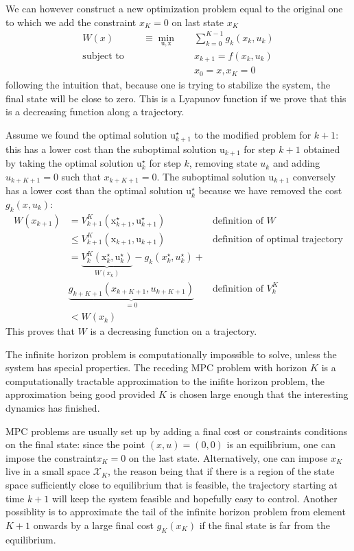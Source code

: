 \documentclass[11pt]{report}
\newcommand{\bs}[1]{\boldsymbol{#1}}
\newcommand{\bsu}{\bs{\mathrm{u}}}
\newcommand{\bsx}{\bs{\mathrm{x}}}
\begin{document}
We can however construct a new optimization problem equal to the original one to which we add the constraint $x_K=0$ on last state $x_K$
\begin{align*}
  W(x) \qquad\quad\equiv \min_{\bsu,\bsx} &\quad \sum_{k=0}^{K-1} g_k(x_k,u_k) \\
  \text{subject to } &\quad x_{k+1} = f(x_k,u_k) \\
  &\quad  x_0 = x, x_K = 0
\end{align*}
following the intuition that, because one is trying to stabilize the system, the final state will be close to zero. This is a Lyapunov function if we prove that this is a decreasing function along a trajectory.

Assume we found the optimal solution $\bsu_{k+1}^\star$ to the modified problem for $k+1$: this has a lower cost than the suboptimal solution $\bsu_{k+1}$ for step $k+1$ obtained by taking the optimal solution $\bsu_k^\star$ for step $k$, removing state $u_k$ and adding $u_{k+K+1} = 0$ such that $x_{k+K+1} = 0$. The suboptimal solution $\bsu_{k+1}$ conversely has a lower cost than the optimal solution $\bsu_k^\star$ because we have removed the cost $g_k(x,u_k)$:
\begin{align*}
  W(x_{k+1}) &= V_{k+1}^K(\bsx_{k+1}^\star, \bsu_{k+1}^\star) & \text{definition of $W$} \\
             & \leq V_{k+1}^K(\bsx_{k+1}, \bsu_{k+1}) & \text{definition of optimal trajectory} \\
             & = \underbrace{V_k^K(\bsx_k^\star, \bsu_k^\star)}_{W(x_k)} - g_k(x_k^\star,u_k^\star) + \\
             & \underbrace{g_{k+K+1}(x_{k+K+1},u_{k+K+1})}_{=0} & \text{definition of $V_k^K$} \\
  & < W(x_k)
\end{align*}
This proves that $W$ is a decreasing function on a trajectory.

The infinite horizon problem is computationally impossible to solve, unless the system has special properties. The receding MPC problem with horizon $K$ is a computationally tractable approximation to the inifite horizon problem, the approximation being good provided $K$ is chosen large enough that the interesting dynamics has finished.

MPC problems are usually set up by adding a final cost or constraints conditions on the final state: since the point $(x,u)=(0,0)$ is an equilibrium, one can impose the constraint$x_K=0$ on the last state. Alternatively, one can impose $x_K$ live in a small space $\mathcal{X}_K$, the reason being that if there is a region of the state space sufficiently close to equilibrium that is feasible, the trajectory starting at time $k+1$ will keep the system feasible and hopefully easy to control. Another possiblity is to approximate the tail of the infinite horizon problem from element $K+1$ onwards by a large final cost $g_K(x_K)$ if the final state is far from the equilibrium.
\end{document}
